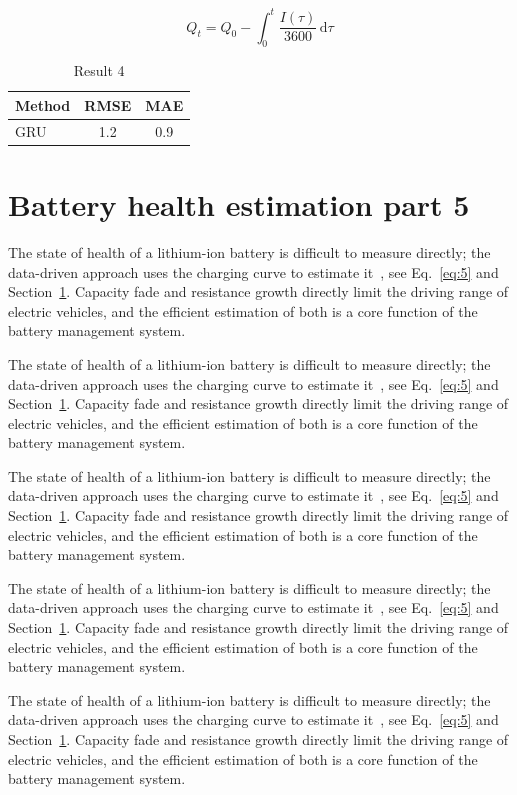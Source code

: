 \documentclass[11pt]{article}
\begin{document}
\begin{equation}\label{eq:4}
  Q_t = Q_0 - \int_0^t \frac{I(\tau)}{3600}\,\mathrm{d}\tau
\end{equation}
\begin{table}[h]\centering\begin{tabular}{lcc}\toprule Method & RMSE & MAE\\\midrule GRU & 1.2 & 0.9\\\bottomrule\end{tabular}\caption{Result 4}\end{table}

\section{Battery health estimation part 5}\label{sec:5}
The state of health of a lithium-ion battery is difficult to measure directly; the data-driven approach uses the charging curve to estimate it~\cite{a2020}, see Eq.~\eqref{eq:5} and Section~\ref{sec:5}. Capacity fade and resistance growth directly limit the driving range of electric vehicles, and the efficient estimation of both is a core function of the battery management system.

The state of health of a lithium-ion battery is difficult to measure directly; the data-driven approach uses the charging curve to estimate it~\cite{a2020}, see Eq.~\eqref{eq:5} and Section~\ref{sec:5}. Capacity fade and resistance growth directly limit the driving range of electric vehicles, and the efficient estimation of both is a core function of the battery management system.

The state of health of a lithium-ion battery is difficult to measure directly; the data-driven approach uses the charging curve to estimate it~\cite{a2020}, see Eq.~\eqref{eq:5} and Section~\ref{sec:5}. Capacity fade and resistance growth directly limit the driving range of electric vehicles, and the efficient estimation of both is a core function of the battery management system.

The state of health of a lithium-ion battery is difficult to measure directly; the data-driven approach uses the charging curve to estimate it~\cite{a2020}, see Eq.~\eqref{eq:5} and Section~\ref{sec:5}. Capacity fade and resistance growth directly limit the driving range of electric vehicles, and the efficient estimation of both is a core function of the battery management system.

The state of health of a lithium-ion battery is difficult to measure directly; the data-driven approach uses the charging curve to estimate it~\cite{a2020}, see Eq.~\eqref{eq:5} and Section~\ref{sec:5}. Capacity fade and resistance growth directly limit the driving range of electric vehicles, and the efficient estimation of both is a core function of the battery management system.
\end{document}
